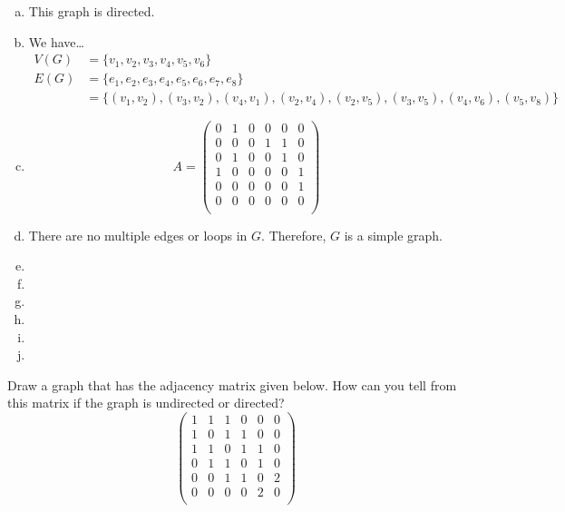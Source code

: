 \documentclass[11pt,letterpaper]{article}
\begin{document}
\sol
\begin{enumerate}[(a)]
\item This graph is directed. 

\item We have\dots
	\[
	\begin{aligned}
	V(G)&= \{ v_1, v_2, v_3, v_4, v_5, v_6 \} \\[0.3cm]
	E(G)&= \{ e_1, e_2, e_3, e_4, e_5, e_6, e_7, e_8 \} \\
	&= \{ (v_1, v_2), (v_3, v_2), (v_4, v_1), (v_2, v_4), (v_2, v_5), (v_3, v_5), (v_4, v_6), (v_5, v_8) \}
	\end{aligned}
	\]

\item 
	\[
	A=
	\begin{pmatrix}
	0 & 1 & 0 & 0 & 0 & 0 \\
	0 & 0 & 0 & 1 & 1 & 0 \\
	0 & 1 & 0 & 0 & 1 & 0 \\
	1 & 0 & 0 & 0 & 0 & 1 \\
	0 & 0 & 0 & 0 & 0 & 1 \\
	0 & 0 & 0 & 0 & 0 & 0 \\
	\end{pmatrix}
	\]

\item There are no multiple edges or loops in $G$. Therefore, $G$ is a simple graph. 

\item 
\item 
\item 
\item 
\item 
\item 
\end{enumerate}





\newpage





 Draw a graph that has the adjacency matrix given below. How can you tell from this matrix if the graph is undirected or directed? 
	\[
	\begin{pmatrix}
	1 & 1 & 1 & 0 & 0 & 0 \\
	1 & 0 & 1 & 1 & 0 & 0 \\
	1 & 1 & 0 & 1 & 1 & 0 \\
	0 & 1 & 1 & 0 & 1 & 0 \\
	0 & 0 & 1 & 1 & 0 & 2 \\
	0 & 0 & 0 & 0 & 2 & 0 \\
	\end{pmatrix}
	\] \pspace
\end{document}
